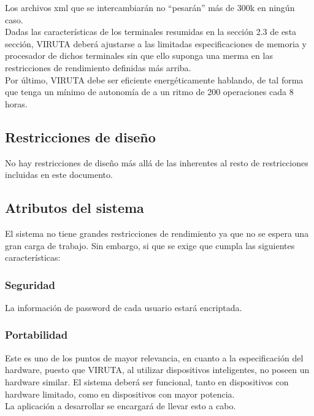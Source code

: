 Los archivos xml que se intercambiarán no ``pesarán'' más de 300k en ningún caso.\\

Dadas las características de los terminales resumidas en la sección 2.3 de esta sección, VIRUTA deberá ajustarse a las limitadas especificaciones de memoria y procesador de dichos terminales sin que ello suponga una merma en las restricciones de rendimiento definidas más arriba.\\

Por último, VIRUTA debe ser eficiente energéticamente hablando, de tal forma que tenga un mínimo de autonomía de  a un ritmo de 200 operaciones cada 8 horas.

\subsection{Restricciones de diseño}

No hay restricciones de diseño más allá de las inherentes al resto de restricciones incluidas en este documento.

\subsection{Atributos del sistema}

El sistema no tiene grandes restricciones de rendimiento ya que no se espera una gran carga de trabajo. Sin embargo, si que se exige que cumpla las siguientes características:

\subsubsection{Seguridad}

La información de password de cada usuario estará encriptada.

\subsubsection{Portabilidad}

Este es uno de los puntos de mayor relevancia, en cuanto a la especificación del hardware, puesto que VIRUTA, al utilizar dispositivos inteligentes, no poseen un hardware similar. El sistema deberá ser funcional, tanto en dispositivos con hardware limitado, como en dispositivos con mayor potencia.\\

La aplicación a desarrollar se encargará de llevar esto a cabo. 

